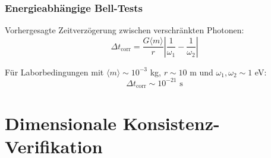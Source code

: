 	\subsubsection{Energieabhängige Bell-Tests}
	
	Vorhergesagte Zeitverzögerung zwischen verschränkten Photonen:
	\begin{equation}
		\Delta t_{\text{corr}} = \frac{G\langle m \rangle}{r} \left|\frac{1}{\omega_1} - \frac{1}{\omega_2}\right|
		\label{eq:correlation_time_delay}
	\end{equation}
	
	Für Laborbedingungen mit $\langle m \rangle \sim 10^{-3}$ kg, $r \sim 10$ m und $\omega_1,\omega_2 \sim 1$ eV:
	\begin{equation}
		\Delta t_{\text{corr}} \sim 10^{-21} \text{ s}
		\label{eq:laboratory_delay}
	\end{equation}

	\section{Dimensionale Konsistenz-Verifikation}
	
	\begin{table}[htbp]
		\centering
		\caption{Dimensionale Konsistenz-Verifikation für Photonendynamik im T0-Modell}
	\end{table}
	

	